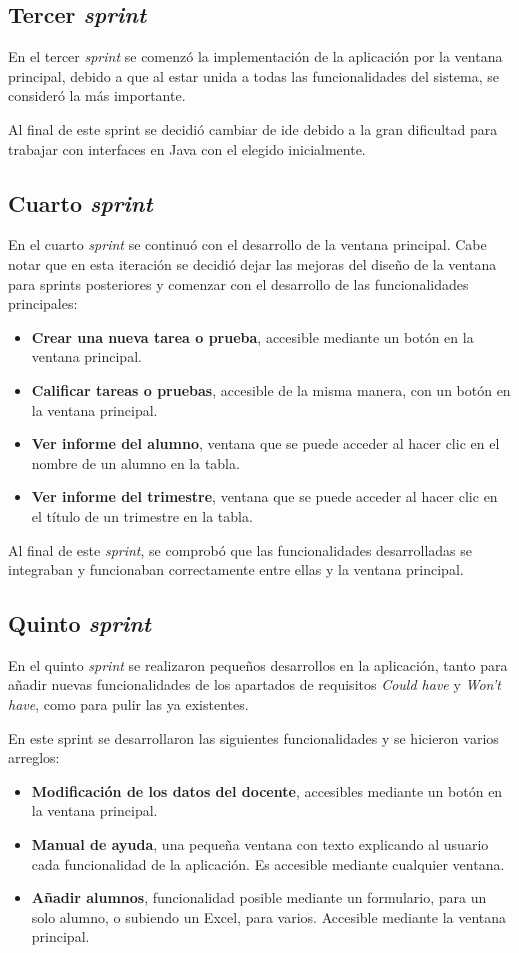 \subsection{Tercer \textit{sprint}}
En el tercer \textit{sprint} se comenzó la implementación de la aplicación por la ventana principal, debido a que al estar unida a todas las funcionalidades del sistema, se consideró la más importante.

Al final de este sprint se decidió cambiar de \gls{ide} debido a la gran dificultad para trabajar con interfaces en Java con el elegido inicialmente.

\subsection{Cuarto \textit{sprint}}
En el cuarto \textit{sprint} se continuó con el desarrollo de la ventana principal. Cabe notar que en esta iteración se decidió dejar las mejoras del diseño de la ventana para sprints posteriores y comenzar con el desarrollo de las funcionalidades principales:
\begin{itemize}
	\item \textbf{Crear una nueva tarea o prueba}, accesible mediante un botón en la ventana principal.
	\item \textbf{Calificar tareas o pruebas}, accesible de la misma manera, con un botón en la ventana principal.
	\item \textbf{Ver informe del alumno}, ventana que se puede acceder al hacer clic en el nombre de un alumno en la tabla.
	\item \textbf{Ver informe del trimestre}, ventana que se puede acceder al hacer clic en el título de un trimestre en la tabla.
\end{itemize}


Al final de este \textit{sprint}, se comprobó que las funcionalidades desarrolladas se integraban y funcionaban correctamente entre ellas y la ventana principal.

\subsection{Quinto \textit{sprint}}
En el quinto \textit{sprint} se realizaron pequeños desarrollos en la aplicación, tanto para añadir nuevas funcionalidades de los apartados de requisitos \textit{Could have} y \textit{Won't have}, como para pulir las ya existentes.

En este sprint se desarrollaron las siguientes funcionalidades y se hicieron varios arreglos:
\begin{itemize}
	\item \textbf{Modificación de los datos del docente}, accesibles mediante un botón en la ventana principal.
	\item \textbf{Manual de ayuda}, una pequeña ventana con texto explicando al usuario cada funcionalidad de la aplicación. Es accesible mediante cualquier ventana.
	\item \textbf{Añadir alumnos}, funcionalidad posible mediante un formulario, para un solo alumno, o subiendo un Excel, para varios. Accesible mediante la ventana principal.	
\end{itemize}

